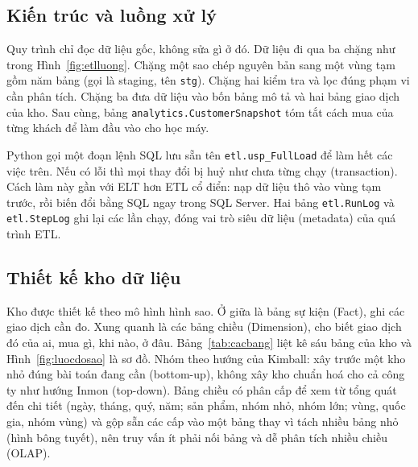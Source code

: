 \subsection{Kiến trúc và luồng xử lý}
Quy trình chỉ đọc dữ liệu gốc, không sửa gì ở đó. Dữ liệu đi qua ba chặng như trong Hình~\ref{fig:etlluong}. Chặng một sao chép nguyên bản sang một vùng tạm gồm năm bảng (gọi là staging, tên \texttt{stg}). Chặng hai kiểm tra và lọc đúng phạm vi cần phân tích. Chặng ba đưa dữ liệu vào bốn bảng mô tả và hai bảng giao dịch của kho. Sau cùng, bảng \texttt{analytics.\allowbreak CustomerSnapshot} tóm tắt cách mua của từng khách để làm đầu vào cho học máy.

Python gọi một đoạn lệnh SQL lưu sẵn tên \texttt{etl.usp\_\allowbreak FullLoad} để làm hết các việc trên. Nếu có lỗi thì mọi thay đổi bị huỷ như chưa từng chạy (transaction). Cách làm này gần với ELT hơn ETL cổ điển: nạp dữ liệu thô vào vùng tạm trước, rồi biến đổi bằng SQL ngay trong SQL Server. Hai bảng \texttt{etl.RunLog} và \texttt{etl.StepLog} ghi lại các lần chạy, đóng vai trò siêu dữ liệu (metadata) của quá trình ETL.

\subsection{Thiết kế kho dữ liệu}
Kho được thiết kế theo mô hình hình sao. Ở giữa là bảng sự kiện (Fact), ghi các giao dịch cần đo. Xung quanh là các bảng chiều (Dimension), cho biết giao dịch đó của ai, mua gì, khi nào, ở đâu. Bảng~\ref{tab:cacbang} liệt kê sáu bảng của kho và Hình~\ref{fig:luocdosao} là sơ đồ. Nhóm theo hướng của Kimball: xây trước một kho nhỏ đúng bài toán đang cần (bottom-up), không xây kho chuẩn hoá cho cả công ty như hướng Inmon (top-down). Bảng chiều có phân cấp để xem từ tổng quát đến chi tiết (ngày, tháng, quý, năm; sản phẩm, nhóm nhỏ, nhóm lớn; vùng, quốc gia, nhóm vùng) và gộp sẵn các cấp vào một bảng thay vì tách nhiều bảng nhỏ (hình bông tuyết), nên truy vấn ít phải nối bảng và dễ phân tích nhiều chiều (OLAP).

\begin{table}[H]
\centering
\caption{Sáu bảng của kho \texttt{CompanyX\_DW} và số bản ghi sau ETL}
\label{tab:cacbang}
\small

\end{table}

